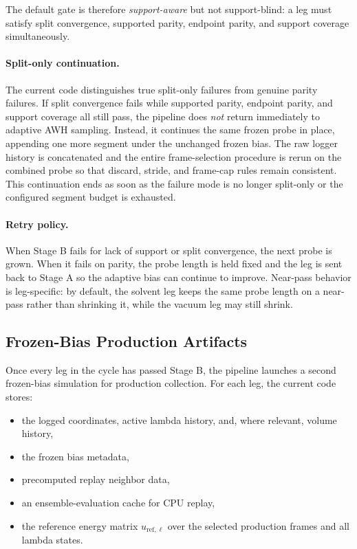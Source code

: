 The default gate is therefore \emph{support-aware} but not support-blind: a leg must satisfy split convergence, supported parity, endpoint parity, and support coverage simultaneously.

\paragraph{Split-only continuation.}

The current code distinguishes true split-only failures from genuine parity failures. If split convergence fails while supported parity, endpoint parity, and  support coverage all still pass, the pipeline does \emph{not} return immediately to adaptive AWH sampling. Instead, it continues the same frozen probe in place, appending one more segment under the unchanged frozen bias. The raw logger history is concatenated and the entire frame-selection procedure is rerun on the combined probe so that discard, stride, and frame-cap rules remain consistent. This continuation ends as soon as the failure mode is no longer split-only or the configured segment budget is exhausted.

\paragraph{Retry policy.}

When Stage B fails for lack of support or split convergence, the next probe is grown. When it fails on parity, the probe length is held fixed and the leg is  sent back to Stage A so the adaptive bias can continue to improve. Near-pass behavior is leg-specific: by default, the solvent leg keeps the same probe length on a near-pass rather than shrinking it, while the vacuum leg may still shrink.

\subsection{Frozen-Bias Production Artifacts}

Once every leg in the cycle has passed Stage B, the pipeline launches a second frozen-bias simulation for production collection. For each leg, the current code stores:

\begin{itemize}
    \item the logged coordinates, active lambda history, and, where relevant, volume history,
    \item the frozen bias metadata,
    \item precomputed replay neighbor data,
    \item an ensemble-evaluation cache for CPU replay,
    \item the reference energy matrix $u_{\mathrm{ref},\ell}$ over the selected production frames and all lambda states.
\end{itemize}

